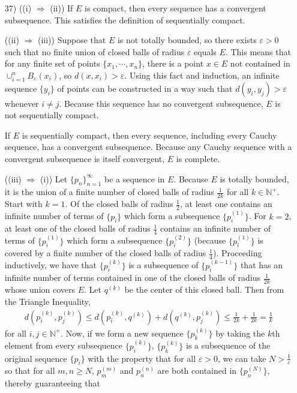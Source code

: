 \documentclass[a4paper,12pt]{article}
\begin{document}
\begin{enumerate}
        \item[37)]
            ((i) $\Rightarrow$ (ii)) If $E$ is compact, then every sequence has a convergent subsequence. This satisfies the definition of sequentially compact. \par
            ((ii) $\Rightarrow$ (iii)) Suppose that $E$ is not totally bounded, so there exists $\varepsilon > 0$ such that no finite union of closed balls of radius $\varepsilon$ equals $E$. This means that for any finite set of points $\{x_1, \cdots, x_n\}$, there is a point $x \in E$ not contained in $\cup_{i = 1}^n B_\varepsilon(x_i)$, so $d(x, x_i) > \varepsilon$. Using this fact and induction, an infinite sequence $\{ y_i \}$ of points can be constructed in a way such that $d(y_i, y_j) > \varepsilon$ whenever $i \neq j$. Because this sequence has no convergent subsequence, $E$ is not sequentially compact. \par
            If $E$ is sequentially compact, then every sequence, including every Cauchy sequence, has a convergent subsequence. Because any Cauchy sequence with a convergent subsequence is itself convergent, $E$ is complete. \par
            ((iii) $\Rightarrow$ (i))
            Let $\{ p_n \}_{n = 1}^\infty$ be a sequence in $E$. Because $E$ is totally bounded, it is the union of a finite number of closed balls of radius $\frac{1}{2k}$ for all $k \in \mathbb{N}^+$. Start with $k = 1$. Of the closed balls of radius $\frac{1}{2}$, at least one contains an infinite number of terms of $\{ p_i \}$ which form a subsequence $\{ p_i^{(1)} \}$. For $k = 2$, at least one of the closed balls of radius $\frac{1}{4}$ contains an infinite number of terms of $\{ p_i^{(1)} \}$ which form a subsequence $\{ p_i^{(2)} \}$ (because $\{ p_i^{(1)} \}$ is covered by a finite number of the closed balls of radius $\frac{1}{4}$). Proceeding inductively, we have that $\{ p_i^{(k)} \}$ is a subsequence of $\{ p_i^{(k - 1)} \}$ that has an infinite number of terms contained in one of the closed balls of radius $\frac{1}{2k}$ whose union covers $E$. Let $q^{(k)}$ be the center of this closed ball. Then from the Triangle Inequality,
            \begin{align*}
                d(p_i^{(k)}, p_j^{(k)}) \leq d(p_i^{(k)}, q^{(k)}) + d(q^{(k)}, p_j^{(k)}) \leq \frac{1}{2k} + \frac{1}{2k} = \frac{1}{k}
            \end{align*}
            for all $i, j \in \mathbb{N}^+$. Now, if we form a new sequence $\{ p_k^{(k)} \}$ by taking the $k$th element from every subsequence $\{ p_i^{(k)} \}$, $\{ p_k^{(k)} \}$ is a subsequence of the original sequence $\{ p_i \}$ with the property that for all $\varepsilon > 0$, we can take $N > \frac{1}{\varepsilon}$ so that for all $m, n \geq N$, $p_m^{(m)}$ and $p_n^{(n)}$ are both contained in $\{ p_n^{(N)} \}$, thereby guaranteeing that

\end{enumerate}
\end{document}
